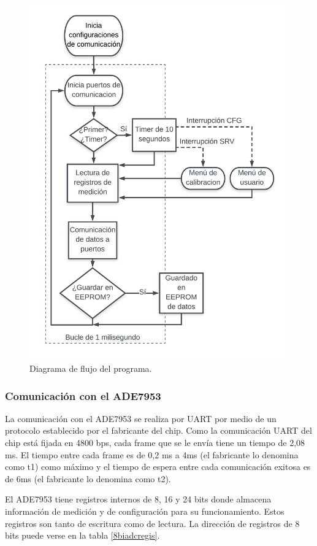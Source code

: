 \begin{figure}[h]
	\centering
	\includegraphics[width=110mm,keepaspectratio]{Figures/Diagramadeprograma.jpeg}
	\caption{Diagrama de flujo del programa.}
	\label{fig:ProgFlux}
\end{figure}


\subsubsection{Comunicación con el ADE7953}

La comunicación con el ADE7953 se realiza por UART por medio de un protocolo establecido por el fabricante del chip. Como la comunicación UART del chip está fijada en 4800 bps, cada frame que se le envía tiene un tiempo de 2,08 ms. El tiempo entre cada frame es de 0,2 ms a 4ms (el fabricante lo denomina como t1) como máximo y el tiempo de espera entre cada comunicación exitosa es de 6ms (el fabricante lo denomina como t2).

El ADE7953 tiene registros internos de 8, 16 y 24 bits donde almacena información de medición y de configuración para su funcionamiento. Estos registros son tanto de escritura como de lectura. La dirección  de registros de 8 bits puede verse en la tabla \ref{8biadcregis}.


